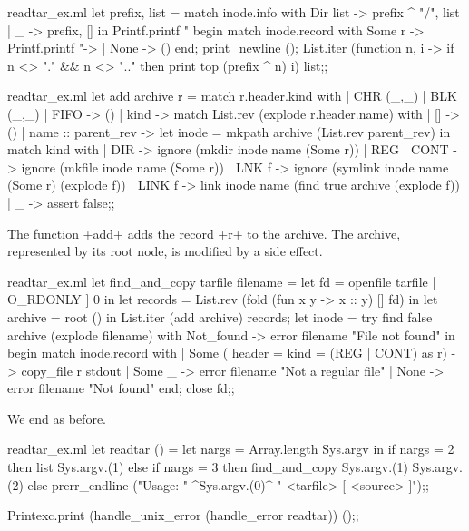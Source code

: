 \begin{answer}
\begin{codefile}{readtar_ex.ml}
  let prefix, list = 
    match inode.info 
    with Dir list -> prefix ^ "/", list
    | _ -> prefix, [] in
  Printf.printf "%
  begin match inode.record with
    Some r ->  Printf.printf "-> %
  | None -> () 
  end;
  print_newline ();
  List.iter (function n, i -> 
    if n <> "." && n <> ".." then  print top (prefix ^ n) i) list;;
\end{codefile}
%
\begin{listingcodefile}{readtar_ex.ml}
let add archive r = 
  match r.header.kind with
  | CHR (_,_) | BLK (_,_) | FIFO -> ()
  | kind -> 
      match List.rev (explode r.header.name) with
      | []  -> ()
      | name :: parent_rev ->
          let inode = mkpath archive (List.rev parent_rev) in
          match kind with 
          | DIR -> ignore (mkdir inode name (Some r))
          | REG | CONT -> ignore (mkfile inode name (Some r))
          | LNK f -> ignore (symlink inode name (Some r) (explode f))
          | LINK f -> link inode name (find true archive (explode f))
          | _ -> assert false;;
\end{listingcodefile}
%
The function \ml+add+ adds the record \ml+r+ to
the archive. The archive, represented by its root node, is modified by a 
side effect. 
%
\begin{listingcodefile}{readtar_ex.ml}
let find_and_copy tarfile filename =
  let fd = openfile tarfile [ O_RDONLY ] 0 in
  let records = List.rev (fold (fun x y -> x :: y) [] fd) in
  let archive = root () in
  List.iter (add archive) records;
  let inode = 
    try find false archive (explode filename)
    with Not_found -> error filename "File not found" in
  begin match inode.record with 
  | Some ({ header = { kind = (REG | CONT) }} as r) -> copy_file r stdout
  | Some _ -> error filename "Not a regular file"
  | None -> error filename "Not found" 
  end;
  close fd;;
\end{listingcodefile}
%
We end as before. 
\begin{listingcodefile}{readtar_ex.ml}
let readtar () =
  let nargs = Array.length Sys.argv in 
  if nargs = 2 then list Sys.argv.(1)
  else if nargs = 3 then find_and_copy Sys.argv.(1) Sys.argv.(2)
  else prerr_endline ("Usage: " ^Sys.argv.(0)^ " <tarfile> [ <source> ]");;

Printexc.print (handle_unix_error (handle_error readtar)) ();;
\end{listingcodefile}
\end{answer}

